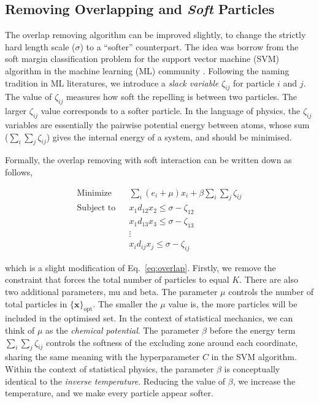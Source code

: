 \documentclass[11pt,twoside]{report}
\begin{document}
\subsection{Removing Overlapping and \emph{Soft} Particles}

The overlap removing algorithm can be improved slightly, to change the strictly hard length scale ($\sigma$) to a ``softer'' counterpart. The idea was borrow from the soft margin classification problem for the support vector machine (SVM) algorithm in the machine learning (ML) community \cite{geron2019}. Following the naming tradition in ML literatures, we introduce a \emph{slack variable} $\zeta_{ij}$ for particle $i$ and $j$. The value of $\zeta_{ij}$ measures how soft the repelling is between two particles. The larger $\zeta_{ij}$ value corresponds to a softer particle. In the language of physics, the $\zeta_{ij}$ variables are essentially the pairwise potential energy between atoms, whose sum ($\sum_i\sum_j\zeta_{ij}$) gives the internal energy of a system, and should be minimised.

Formally, the overlap removing with soft interaction can be written down as follows,

\begin{equation}
\begin{aligned}
	\textrm{Minimize} && 
	\sum_i{(e_i + \mu) x_i} + \beta \sum_i \sum_j \zeta_{ij} \\
	\textrm{Subject to} &&  x_1 d_{12}  x_2 \le \sigma - \zeta_{12}\\
	&&  x_1 d_{13}  x_3 \le \sigma - \zeta_{13}\\
	&& \vdots  \\
	&& x_i d_{ij}  x_j \le \sigma - \zeta_{ij}
\label{eq:overlap-soft}
\end{aligned}
\end{equation}

\noindent which is a slight modification of Eq.~\ref{eq:overlap}.
Firstly, we remove the constraint that forces the total number of particles to equal $K$. 
There are also two additional parameters, \gls{mu} and \gls{beta}.
The parameter $\mu$ controls the number of total particles in $\{\mathbf{x}\}_\mathrm{opt}$. The smaller the $\mu$ value is, the more particles will be included in the optimised set. In the context of statistical mechanics, we can think of $\mu$ as the \emph{chemical potential}.
The parameter $\beta$ before the energy term $\sum_i\sum_j \zeta_{ij}$ controls the softness of the excluding zone around each coordinate, sharing the same meaning with the hyperparameter $C$ in the SVM algorithm. Within the context of statistical physics, the parameter $\beta$ is conceptually identical to the \emph{inverse temperature}. Reducing the value of $\beta$, we increase the temperature, and we make every particle appear softer. 
\end{document}
